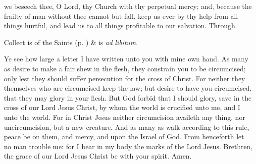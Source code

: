 \collect
{} we beseech thee, O Lord, thy Church with thy perpetual mercy; and, because the frailty of man without thee cannot but fall, keep us ever by thy help from all things hurtful, and lead us to all things profitable to our salvation. Through.
\begin{rubric}
     Collect is of the Saints (p. \pageref{SPSaints}) \&  is \emph{ad libitum}.
\end{rubric}

 Ye see how large a letter I have written unto you with mine own hand. As many as desire to make a fair shew in the flesh, they constrain you to be circumcised; only lest they should suffer persecution for the cross of Christ. For neither they themselves who are circumcised keep the law; but desire to have you circumcised, that they may glory in your flesh. But God forbid that I should glory, save in the cross of our Lord Jesus Christ, by whom the world is crucified unto me, and I unto the world. For in Christ Jesus neither circumcision availeth any thing, nor uncircumcision, but a new creature. And as many as walk according to this rule, peace be on them, and mercy, and upon the Israel of God. From henceforth let no man trouble me: for I bear in my body the marks of the Lord Jesus. Brethren, the grace of our Lord Jesus Christ be with your spirit. Amen.


